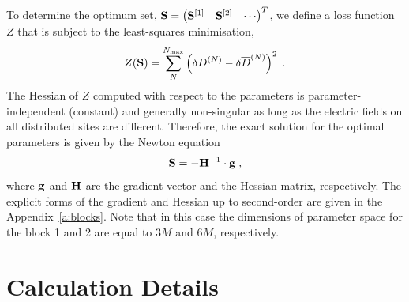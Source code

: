 \documentclass[aip,amsmath,amssymb,reprint,floatfix]{revtex4-1}
\begin{document}
To determine the optimum set,
$
 {\bf S} = 
\begin{pmatrix}
{\bf S}^{[1]} &
{\bf S}^{[2]} & \cdots
\end{pmatrix}^T
$, we define a loss function $Z$ 
that is subject to the least\hyp{}squares minimisation,
%
\begin{equation}\label{e:Z}
 Z({\bf S}) = \sum_N^{N_{\rm max}} \left( \delta D^{(N)} - \delta \overline{D}^{(N)} \right)^2 \;.
\end{equation}
%
The Hessian of $Z$ computed with respect to the parameters 
is parameter\hyp{}independent (constant) and generally non\hyp{}singular
as long as the electric fields on all distributed sites are different.
Therefore, the exact solution for the optimal parameters is given by the Newton equation
%
\begin{equation}\label{e:Newton}
 {\bf S} = -{\bf H}^{-1} \cdot {\bf g} \;,
\end{equation}
%
where ${\bf g}$ and ${\bf H}$ are the gradient vector and the Hessian matrix, respectively.
The explicit forms of the gradient and Hessian up to second\hyp{}order 
are given in the Appendix~\ref{a:blocks}.
Note that in this case the dimensions of parameter space for the block 1 and 2 are
equal to $3M$ and $6M$, respectively.

\section{\label{s:3}Calculation Details}
\end{document}
